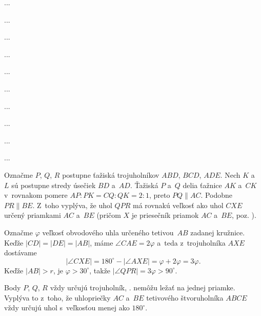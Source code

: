 {%
...}

{%
...}

{%
...}

{%
...}

{%
...}

{%
...}

{%
...}

{%
...}

{%
...}

{%
...}

{%
Označme $P$, $Q$, $R$ postupne ťažiská trojuholníkov $ABD$, $BCD$, $ADE$. Nech $K$ a~$L$ sú postupne stredy úsečiek $BD$ a~$AD$. Ťažiská $P$ a~$Q$ delia ťažnice $AK$ a~$CK$ v~rovnakom pomere $AP:PK=CQ:QK=2:1$, preto $PQ\parallel AC$. Podobne $PR\parallel BE$. Z~toho vyplýva, že uhol $QPR$ má rovnakú veľkosť ako uhol $CXE$ určený priamkami $AC$ a~$BE$ (pričom $X$ je priesečník priamok $AC$ a~$BE$, poz. \obr).
%

Označme $\varphi$ veľkosť obvodového uhla určeného tetivou~$AB$ zadanej kružnice. Keďže $|CD|=|DE|=|AB|$, máme $\angle CAE=2\varphi$ a~teda z~trojuholníka $AXE$ dostávame
$$
|\angle CXE|=180^\circ-|\angle AXE|=\varphi+2\varphi=3\varphi.
$$
Keďže $|AB|>r$, je $\varphi>30^\circ$, takže $|\angle QPR|=3\varphi>90^\circ$.

\poznamka
Body $P$, $Q$, $R$ vždy určujú trojuholník, \tj. nemôžu ležať na jednej priamke. Vyplýva to z~toho, že uhlopriečky $AC$ a~$BE$ tetivového štvoruholníka $ABCE$ vždy určujú uhol s~veľkosťou menej ako $180^\circ$.
}

